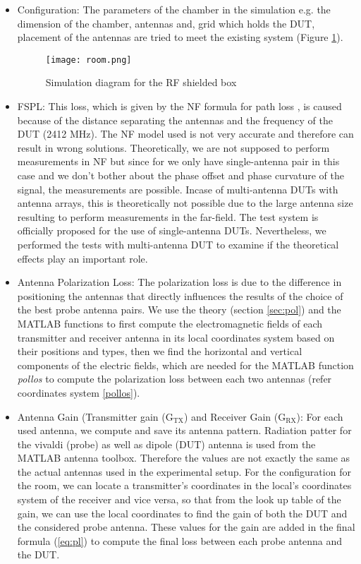 \begin{itemize}
  \item Configuration: The parameters of the chamber in the simulation e.g. the dimension of the chamber, antennas and, grid which holds the \acs{DUT}, placement of the antennas are tried to meet the existing system (Figure \ref{fig:room}). 
  \begin{figure}[H]
\texttt{[image: room.png]}
\caption{Simulation diagram for the \acs{RF} shielded box}
\label{fig:room} 
\end{figure}

  \item \acf{FSPL}: This loss, which is given by the \acf{NF} formula for path loss \cite{schantz}, is caused because of the distance separating the antennas and the frequency of the \acs{DUT} (2412 MHz). The \acs{NF} model used is not very accurate and therefore can result in wrong solutions. Theoretically, we are not supposed to perform measurements in \acf{NF} but since for we only have single-antenna pair in this case and we don't bother about the phase offset and phase curvature of the signal, the measurements are possible. Incase of multi-antenna \acsp{DUT} with antenna arrays, this is theoretically not possible due to the large antenna size resulting to perform measurements in the far-field. The test system is officially proposed for the use of single-antenna \acsp{DUT}. Nevertheless, we performed the tests with multi-antenna \acs{DUT} to examine if the theoretical effects play an important role.
 
  \item Antenna Polarization Loss: The polarization loss is due to the difference in positioning the antennas that directly influences the results of the choice of the best probe antenna pairs. We use the theory (section \ref{sec:pol}) and the MATLAB\textregistered{} functions to first compute the electromagnetic fields of each transmitter and receiver antenna in its local coordinates system based on their positions and types, then we find the horizontal and vertical components of the electric fields, which are needed for the MATLAB\textregistered{} function \textit{pollos} to compute the polarization loss between each two antennas (refer coordinates system \ref{pollos}).
  
  \item Antenna Gain (Transmitter gain ($\mbox{G}_{\mbox{TX}}$) and Receiver Gain ($\mbox{G}_{\mbox{RX}}$): For each used antenna, we compute and save its antenna pattern. Radiation patter for the vivaldi (probe) as well as dipole (\acs{DUT}) antenna is used from the MATLAB\textregistered{} antenna toolbox. Therefore the values are not exactly the same as the actual antennas used in the experimental setup. For the configuration for the room, we can locate a transmitter's coordinates in the local's coordinates system of the receiver and vice versa, so that from the look up table of the gain, we can use the local coordinates to find the gain of both the \acs{DUT} and the considered probe antenna. These values for the gain are added in the final formula  (\ref{eq:pl}) to compute the final loss between each probe antenna and the \acs{DUT}.
  

\end{itemize}
